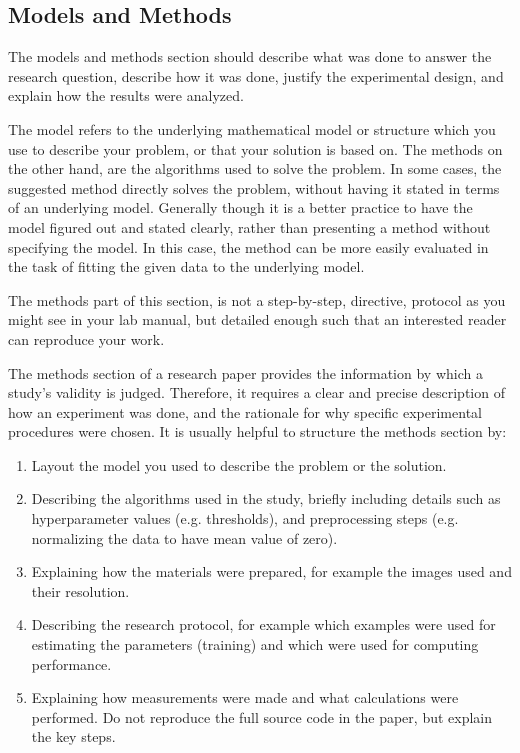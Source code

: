 \documentclass[10pt,conference,compsocconf]{IEEEtran}
\begin{document}
\subsection{Models and Methods}
The models and methods
section should describe what was
done to answer the research question, describe how it was done,
justify the experimental design, and
explain how the results were analyzed.

The model refers to the underlying mathematical model or structure which 
you use to describe your problem, or that your solution is based on. 
The methods on the other hand, are the algorithms used to solve the problem. 
In some cases, the suggested method directly solves the problem, without having it 
stated in terms of an underlying model. Generally though it is a better practice to have 
the model figured out and stated clearly, rather than presenting a method without specifying 
the model. In this case, the method can be more easily evaluated in the task of fitting 
the given data to the underlying model.

The methods part of this section, is not a step-by-step, directive,
protocol as you might see in your lab manual, but detailed enough such
that an interested reader can reproduce your
work.

The methods section of a research paper provides the information by
which a study's validity is judged.
Therefore, it requires a clear and precise description of how an
experiment was done, and the rationale
for why specific experimental procedures were chosen.
It is usually helpful to
structure the methods section by:
\begin{enumerate}
\item Layout the model you used to describe the problem or the solution.
\item Describing the algorithms used in the study, briefly including
  details such as hyperparameter values (e.g. thresholds), and
  preprocessing steps (e.g. normalizing the data to have mean value of
  zero).
\item Explaining how the materials were prepared, for example the
  images used and their resolution.
\item Describing the research protocol, for example which examples
  were used for estimating the parameters (training) and which were
  used for computing performance.
\item Explaining how measurements were made and what
  calculations were performed. Do not reproduce the full source code in
  the paper, but explain the key steps.
\end{enumerate}
\end{document}
